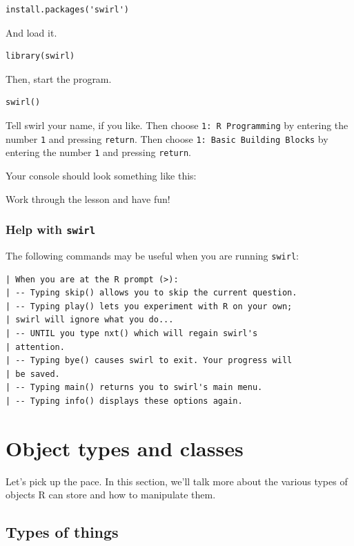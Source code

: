 \documentclass[]{article}
\begin{document}
\begin{verbatim}
install.packages('swirl')
\end{verbatim}

And load it.

\begin{verbatim}
library(swirl)
\end{verbatim}

Then, start the program.

\begin{verbatim}
swirl()
\end{verbatim}

Tell swirl your name, if you like. Then choose
\texttt{1:\ R\ Programming} by entering the number \texttt{1} and
pressing \texttt{return}. Then choose
\texttt{1:\ Basic\ Building\ Blocks} by entering the number \texttt{1}
and pressing \texttt{return}.

Your console should look something like this:

Work through the lesson and have fun!

\subsubsection{\texorpdfstring{Help with
\texttt{swirl}}{Help with swirl}}\label{help-with-swirl}

The following commands may be useful when you are running
\texttt{swirl}:

\begin{verbatim}
| When you are at the R prompt (>):
| -- Typing skip() allows you to skip the current question.
| -- Typing play() lets you experiment with R on your own;
| swirl will ignore what you do...
| -- UNTIL you type nxt() which will regain swirl's
| attention.
| -- Typing bye() causes swirl to exit. Your progress will
| be saved.
| -- Typing main() returns you to swirl's main menu.
| -- Typing info() displays these options again.
\end{verbatim}

\section{Object types and classes}\label{object-types-and-classes}

Let's pick up the pace. In this section, we'll talk more about the
various types of objects R can store and how to manipulate them.

\subsection{Types of things}\label{types-of-things}
\end{document}
